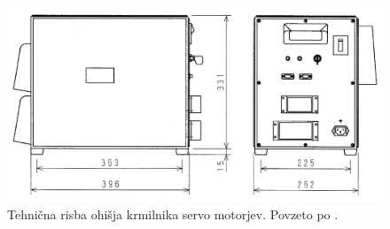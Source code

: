 \begin{figure}
	\centering
	\includegraphics[height=\textwidth]{./Slike/pa10-servocontroller.png}
	\caption{Tehni\v{c}na risba ohi\v{s}ja krmilnika servo motorjev. Povzeto po \cite{pa10-manual}.}
	\label{fig:pa10-dh}
\end{figure}
